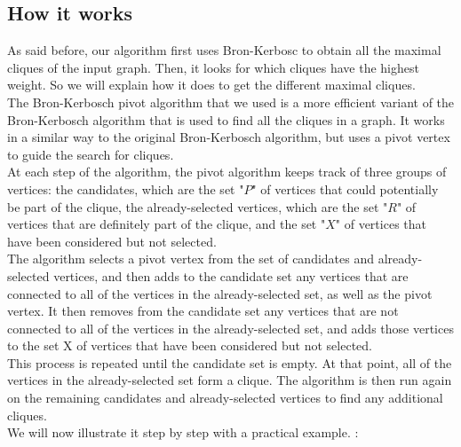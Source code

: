 
\subsection{How it works}

    As said before, our algorithm first uses Bron-Kerbosc to obtain all the maximal cliques of the input graph. Then, it looks for which cliques have the highest weight. So we will explain how it does to get the different maximal cliques. \\

    The Bron-Kerbosch pivot algorithm that we used is a more efficient variant of the Bron-Kerbosch algorithm that is used to find all the cliques in a graph. It works in a similar way to the original Bron-Kerbosch algorithm, but uses a pivot vertex to guide the search for cliques. \\

    At each step of the algorithm, the pivot algorithm keeps track of three groups of vertices: the candidates, which are the set "$P$" of vertices that could potentially be part of the clique, the already-selected vertices, which are the set "$R$" of vertices that are definitely part of the clique, and the set "$X$" of vertices that have been considered but not selected. \\

    The algorithm selects a pivot vertex from the set of candidates and already-selected vertices, and then adds to the candidate set any vertices that are connected to all of the vertices in the already-selected set, as well as the pivot vertex. It then removes from the candidate set any vertices that are not connected to all of the vertices in the already-selected set, and adds those vertices to the set X of vertices that have been considered but not selected. \\

    This process is repeated until the candidate set is empty. At that point, all of the vertices in the already-selected set form a clique. The algorithm is then run again on the remaining candidates and already-selected vertices to find any additional cliques. \\

    We will now illustrate it step by step with a practical example. : \\

